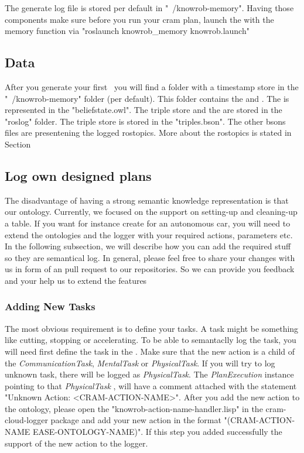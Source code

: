 The generate log file is stored per default in "~/knowrob-memory".
Having those components make sure before you run your cram plan, launch the \knowrob with the memory function via "roslaunch knowrob\_memory knowrob.launch" 

\subsection{Data}
After you generate your first \neem~you will find a folder with a timestamp store in the "~/knowrob-memory" folder (per default).
This folder contains the \neemnar and \neemexp . The \neemnar is represented in the "beliefstate.owl". The triple store and the \neemexp are stored in the "roslog" folder. The triple store is stored in the "triples.bson". The other bsons files are presentening the logged rostopics. More about the rostopics is stated in Section 

\subsection{Log own designed plans}
The disadvantage of having a strong semantic knowledge representation is that our ontology.
Currently, we focused on the support on setting-up and cleaning-up a table.
If you want for instance create \neems for an autonomous car, you will need to extend the \ease ontologies and the logger with your required actions, parameters etc.
In the following subsection, we will describe how you can add the required stuff so they are semantical log.
In general, please feel free to share your changes with us in form of an pull request to our repositories.
So we can provide you feedback and your help us to extend the features

\subsubsection{Adding New Tasks}
The most obvious requirement is to define your tasks.
A task might be something like cutting, stopping or accelerating.
To be able to semantaclly log the task, you will need first define the task in the \easeAct.
Make sure that the new action is a child of the \textit{CommunicationTask}, \textit{MentalTask} or \textit{PhysicalTask}.
If you will try to log unknown task, there will be logged as \textit{PhysicalTask}.
The \textit{PlanExecution} instance pointing to that \textit{PhysicalTask} , will have a comment attached with the statement "Unknown Action: <CRAM-ACTION-NAME>".
After you add the new action to the ontology, please open the "knowrob-action-name-handler.lisp" in the cram-cloud-logger package and add your new action in the format "(CRAM-ACTION-NAME EASE-ONTOLOGY-NAME)".
If this step you added successfully the support of the new action to the logger.

